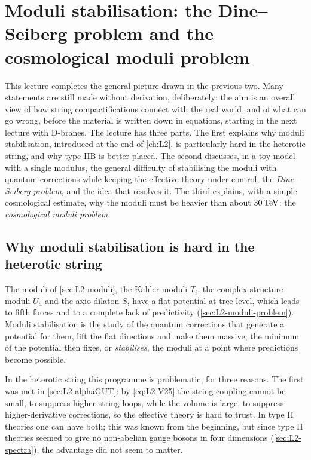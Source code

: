 \chapter{Moduli stabilisation: the Dine--Seiberg problem and the cosmological moduli problem}
\label{ch:L3}

This lecture completes the general picture drawn in the previous two. Many statements are still made without derivation, deliberately: the aim is an overall view of how string compactifications connect with the real world, and of what can go wrong, before the material is written down in equations, starting in the next lecture with D-branes. The lecture has three parts. The first explains why moduli stabilisation, introduced at the end of \cref{ch:L2}, is particularly hard in the heterotic string, and why type IIB is better placed. The second discusses, in a toy model with a single modulus, the general difficulty of stabilising the moduli with quantum corrections while keeping the effective theory under control, the \emph{Dine--Seiberg problem}, and the idea that resolves it. The third explains, with a simple cosmological estimate, why the moduli must be heavier than about $30\,\mathrm{TeV}$: the \emph{cosmological moduli problem}.

\section{Why moduli stabilisation is hard in the heterotic string}
\label{sec:L3-heterotic}

The moduli of \cref{sec:L2-moduli}, the Kähler moduli $T_i$, the complex-structure moduli $U_a$ and the axio-dilaton $S$, have a flat potential at tree level, which leads to fifth forces and to a complete lack of predictivity (\cref{sec:L2-moduli-problem}). Moduli stabilisation is the study of the quantum corrections that generate a potential for them, lift the flat directions and make them massive; the minimum of the potential then fixes, or \emph{stabilises}, the moduli at a point where predictions become possible.

In the heterotic string this programme is problematic, for three reasons. The first was met in \cref{sec:L2-alphaGUT}: by \cref{eq:L2-V25} the string coupling cannot be small, to suppress higher string loops, while the volume is large, to suppress higher-derivative corrections, so the effective theory is hard to trust. In type II theories one can have both; this was known from the beginning, but since type II theories seemed to give no non-abelian gauge bosons in four dimensions (\cref{sec:L2-spectra}), the advantage did not seem to matter.

